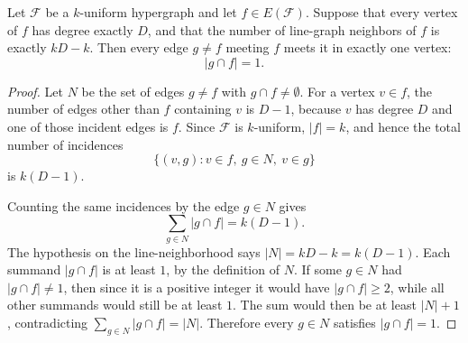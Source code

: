 \begin{helper}
Let $\mathcal F$ be a $k$-uniform hypergraph and let $f\in E(\mathcal F)$.
Suppose that every vertex of $f$ has degree exactly $D$, and that the number
of line-graph neighbors of $f$ is exactly $kD-k$.  Then every edge
$g\ne f$ meeting $f$ meets it in exactly one vertex:
\[
|g\cap f|=1 .
\]
\end{helper}
\begin{proof}
Let $N$ be the set of edges $g\ne f$ with $g\cap f\ne\emptyset$.  For a
vertex $v\in f$, the number of edges other than $f$ containing $v$ is
$D-1$, because $v$ has degree $D$ and one of those incident edges is $f$.
Since $\mathcal F$ is $k$-uniform, $|f|=k$, and hence the total number of
incidences
\[
\{(v,g): v\in f,\ g\in N,\ v\in g\}
\]
is $k(D-1)$.

Counting the same incidences by the edge $g\in N$ gives
\[
\sum_{g\in N}|g\cap f|=k(D-1).
\]
The hypothesis on the line-neighborhood says
$|N|=kD-k=k(D-1)$.  Each summand $|g\cap f|$ is at least $1$, by the
definition of $N$.  If some $g\in N$ had $|g\cap f|\ne 1$, then since it is
a positive integer it would have $|g\cap f|\ge2$, while all other summands
would still be at least $1$.  The sum would then be at least $|N|+1$,
contradicting $\sum_{g\in N}|g\cap f|=|N|$.  Therefore every $g\in N$
satisfies $|g\cap f|=1$.
\end{proof}

